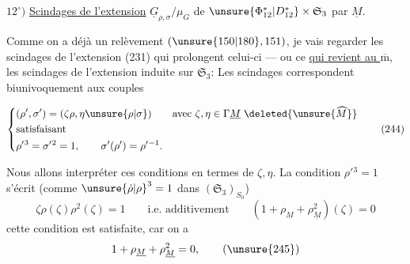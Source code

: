 $12^\circ)$ \uline{Scindages de l'extension}
$\underline G_{\rho,\sigma}/\mu_G$ de
$\unsure{\Phi_{12}^{*}|D_{12}^{*}}\times\mathfrak S_3$
par $\underline M$.

Comme on a déjà un relèvement
$(\unsure{150|180},151)$, je vais regarder les scindages
de l'extension (231) qui prolongent celui-ci --- ou ce
\uline{qui revient au $\overline{\mathrm m}$}, les scindages
de l'extension induite sur $\mathfrak S_3$:
Les scindages correspondent 
biunivoquement aux couples



\[
\left\{\begin{aligned}
 &(\rho',\sigma')=(\zeta\rho,\eta\unsure{\rho|\sigma})
   \qquad\text{avec }\zeta,\eta\in\Gamma\underline M
   \;\deleted{\unsure{\widehat M}}\\
 &\text{satisfaisant}\\
 &\rho'{}^3=\sigma'{}^2=1,\qquad
   \sigma'(\rho')=\rho'{}^{-1}.
\end{aligned}\right.
\tag{244}
\]

Nous allons interpréter ces conditions en termes de $\zeta,\eta$.
La condition $\rho'{}^3=1$ s'écrit
(comme $\unsure{\dot\rho|\rho}^3=1$ dans $(\mathfrak S_3)_{S_0}$)
\[
\zeta\rho(\zeta)\rho^2(\zeta)=1
\qquad\text{i.e. additivement}\qquad
(1+\rho_{\underline M}+\rho_{\underline M}^2)(\zeta)=0
\tag{245}
\]
cette condition est  satisfaite, car on a
\[
1+\rho_{\underline M}+\rho_{\underline M}^2=0,
\tag{\unsure{245}}
\]

